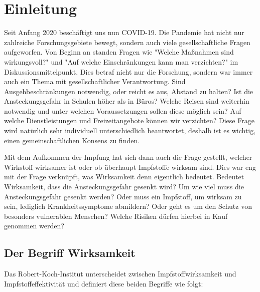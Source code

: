 \chapter{Einleitung}
\label{cha:Einleitung}

Seit Anfang 2020 beschäftigt uns nun COVID-19. Die Pandemie hat nicht nur zahlreiche Forschungsgebiete bewegt, sondern auch viele gesellschaftliche Fragen aufgeworfen. Von Beginn an standen Fragen wie "Welche Maßnahmen sind wirkungsvoll?" und "Auf welche Einschränkungen kann man verzichten?" im Diskussionsmittelpunkt. Dies betraf nicht nur die Forschung, sondern war immer auch ein Thema mit gesellschaftlicher Verantwortung. Sind Ausgehbeschränkungen notwendig, oder reicht es aus, Abstand zu halten? Ist die Ansteckungsgefahr in Schulen höher als in Büros? Welche Reisen sind weiterhin notwendig und unter welchen Voraussetzungen sollen diese möglich sein? Auf welche Dienstleistungen und Freizeitangebote können wir verzichten?
Diese Frage wird natürlich sehr individuell unterschiedlich beantwortet, deshalb ist es wichtig, einen gemeinschaftlichen Konsens zu finden.

Mit dem Aufkommen der Impfung hat sich dann auch die Frage gestellt, welcher Wirkstoff wirksamer ist oder ob überhaupt Impfstoffe wirksam sind. Dies war eng mit der Frage verknüpft, was Wirksamkeit denn eigentlich bedeutet. Bedeutet Wirksamkeit, dass die Ansteckungsgefahr gesenkt wird? Um wie viel muss die Ansteckungsgefahr gesenkt werden? Oder muss ein Impfstoff, um wirksam zu sein, lediglich Krankheitssymptome abmildern? Oder geht es um den Schutz von besonders vulnerablen Menschen? Welche Risiken dürfen hierbei in Kauf genommen werden?

\section{Der Begriff Wirksamkeit}
\label{sec:wirksamkeit}

Das Robert-Koch-Institut unterscheidet zwischen Impfstoffwirksamkeit und Impfstoffeffektivität und definiert diese beiden Begriffe wie folgt: \cite{rki-handbuch}

